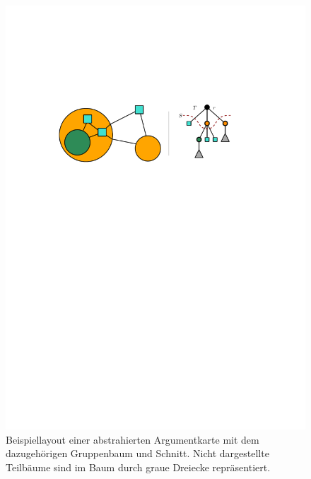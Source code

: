 \begin{figure}[h!]
\begin{center} 
  \includegraphics[width=0.6\linewidth]{Pics/LayoutbeispielBaum.pdf}
  \caption{Beispiellayout einer abstrahierten Argumentkarte mit dem dazugehörigen Gruppenbaum und Schnitt. Nicht dargestellte Teilbäume sind im Baum durch graue Dreiecke repräsentiert.}
  \label{f:LayoutbeispielKlein}
\end{center}
\end{figure}




